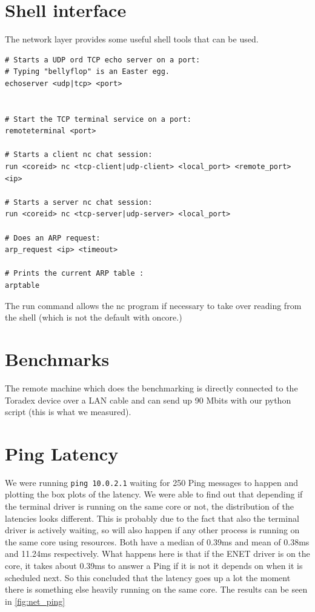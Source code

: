 \section{Shell interface}

The network layer provides some useful shell tools that can be used.

\begin{verbatim}
# Starts a UDP ord TCP echo server on a port:
# Typing "bellyflop" is an Easter egg.
echoserver <udp|tcp> <port> 


# Start the TCP terminal service on a port:
remoteterminal <port>

# Starts a client nc chat session:
run <coreid> nc <tcp-client|udp-client> <local_port> <remote_port> <ip>

# Starts a server nc chat session:
run <coreid> nc <tcp-server|udp-server> <local_port> 

# Does an ARP request:
arp_request <ip> <timeout>

# Prints the current ARP table :
arptable

\end{verbatim}

The run command allows the nc program if necessary to take over reading from the shell (which is not the default with oncore.)


\section{Benchmarks}

The remote machine which does the benchmarking is directly connected to the Toradex device over a LAN cable and can send up 90 Mbits with our python script (this is what we measured).

\section{Ping Latency}
\label{sec:ping}

We were running \texttt{ping  10.0.2.1} waiting for 250 Ping messages to happen and plotting the box plots of the latency. We were able to find out that depending if the terminal driver is running on the same core or not, the distribution of the latencies looks different. This is probably due to the fact that also the terminal driver is actively waiting, so will also happen if any other process is running on the same core using resources. Both have a median of 0.39ms and mean of 0.38ms
and 11.24ms respectively. What happens here is that if the ENET driver is on the core, it takes about 0.39ms to answer a Ping if it is not it depends on when it is scheduled next. So this concluded that the latency goes up a lot the moment there is something else heavily running on the same core. The results can be seen in \ref{fig:net_ping}

